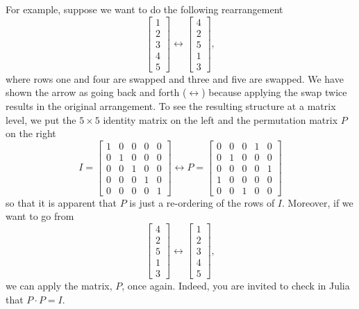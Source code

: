 For example, suppose we want to do the following rearrangement
\begin{equation}
\label{eq:Permuation}
     \left[\begin{array}{r} 1 \\2 \\3 \\ 4 \\ 5\end{array} \right] \leftrightarrow \left[\begin{array}{r} 4 \\2 \\5 \\ 1 \\ 3\end{array} \right],
\end{equation}
where rows one and four are swapped and three and five are swapped. We have shown the arrow as going back and forth ($\leftrightarrow$) because applying the swap twice results in the original arrangement. To see the resulting structure at a matrix level, we put the $5 \times 5$ identity matrix on the left and the permutation matrix $P$ on the right
$$
I=\begin{bmatrix}
1&0&0&0&0\\
0&1&0&0&0\\
0&0&1&0&0\\
0&0&0&1&0\\
0&0&0&0&1
\end{bmatrix} \leftrightarrow
P=\begin{bmatrix}
0&0&0&1&0\\
0&1&0&0&0\\
0&0&0&0&1\\
1&0&0&0&0\\
0&0&1&0&0
\end{bmatrix}
$$
so that it is apparent that $P$ is just a re-ordering of the rows of $I$. Moreover, if we want to go from 
$$  \left[\begin{array}{r} 4 \\2 \\5 \\ 1 \\ 3\end{array} \right] \leftrightarrow \left[\begin{array}{r} 1 \\2 \\3 \\ 4 \\ 5\end{array} \right],$$
we can apply the matrix, $P$, once again. Indeed, you are invited to check in Julia that $P \cdot P=I$. \\

